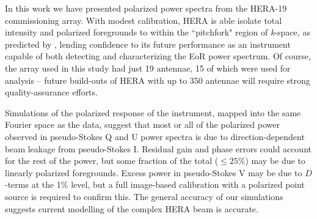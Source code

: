 In this work we have presented polarized power spectra from the HERA-19 commissioning array. With modest calibration, HERA is able isolate total intensity and polarized foregrounds to within the ``pitchfork" region of \textit{k}-space, as predicted by \cite{Nithya.15b}, lending confidence to its future performance as an instrument capable of both detecting and characterizing the EoR power spectrum. Of course, the array used in this study had just 19 antennae, 15 of which were used for analysis -- future build-outs of HERA with up to 350 antennae will require strong quality-assurance efforts.

Simulations of the polarized response of the instrument, mapped into the same Fourier space as the data, suggest that most or all of the polarized power observed in pseudo-Stokes Q and U power spectra is due to direction-dependent beam leakage from pseudo-Stokes I. Residual gain and phase errors could account for the rest of the power, but some fraction of the total ($\leqslant 25\%$) may be due to linearly polarized foregrounds. Excess power in pseudo-Stokes V may be due to $D$-terms at the 1\% level, but a full image-based calibration with a polarized point source is required to confirm this. The general accuracy of our simulations suggests current modelling of the complex HERA beam is accurate.
